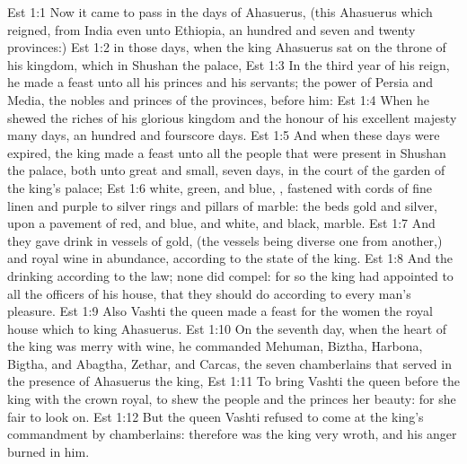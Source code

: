 \vs Est 1:1 Now it came to pass in the days of Ahasuerus, (this  Ahasuerus which reigned, from India even unto Ethiopia,  an hundred and seven and twenty provinces:)
\vs Est 1:2  in those days, when the king Ahasuerus sat on the throne of his kingdom, which  in Shushan the palace,
\vs Est 1:3 In the third year of his reign, he made a feast unto all his princes and his servants; the power of Persia and Media, the nobles and princes of the provinces,  before him:
\vs Est 1:4 When he shewed the riches of his glorious kingdom and the honour of his excellent majesty many days,  an hundred and fourscore days.
\vs Est 1:5 And when these days were expired, the king made a feast unto all the people that were present in Shushan the palace, both unto great and small, seven days, in the court of the garden of the king's palace;
\vs Est 1:6  white, green, and blue, , fastened with cords of fine linen and purple to silver rings and pillars of marble: the beds  gold and silver, upon a pavement of red, and blue, and white, and black, marble.
\vs Est 1:7 And they gave  drink in vessels of gold, (the vessels being diverse one from another,) and royal wine in abundance, according to the state of the king.
\vs Est 1:8 And the drinking  according to the law; none did compel: for so the king had appointed to all the officers of his house, that they should do according to every man's pleasure.
\vs Est 1:9 Also Vashti the queen made a feast for the women  the royal house which  to king Ahasuerus.
\vs Est 1:10 On the seventh day, when the heart of the king was merry with wine, he commanded Mehuman, Biztha, Harbona, Bigtha, and Abagtha, Zethar, and Carcas, the seven chamberlains that served in the presence of Ahasuerus the king,
\vs Est 1:11 To bring Vashti the queen before the king with the crown royal, to shew the people and the princes her beauty: for she  fair to look on.
\vs Est 1:12 But the queen Vashti refused to come at the king's commandment by  chamberlains: therefore was the king very wroth, and his anger burned in him.
